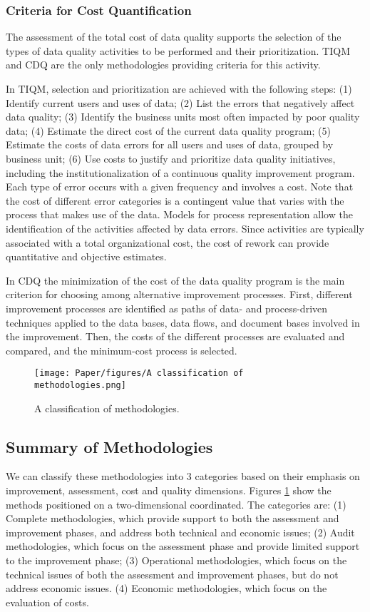 \documentclass[pdftex,english,oribibl]{llncs}
\begin{document}
\subsubsection{Criteria for Cost Quantification}
The assessment of the total cost of data quality supports the selection of the types of data quality activities to be performed and their prioritization. TIQM and CDQ are the only methodologies providing criteria for this activity.

In TIQM, selection and prioritization are achieved with the following steps:
(1) Identify current users and uses of data;
(2) List the errors that negatively affect data quality;
(3) Identify the business units most often impacted by poor quality data;
(4) Estimate the direct cost of the current data quality program;
(5) Estimate the costs of data errors for all users and uses of data, grouped by business unit;
(6) Use costs to justify and prioritize data quality initiatives, including the institutionalization of a continuous quality improvement program.
Each type of error occurs with a given frequency and involves a cost. Note that the cost of different error categories is a contingent value that varies with the process that makes use of the data. Models for process representation allow the identification of the activities affected by data errors. Since activities are typically associated with a total organizational cost, the cost of rework can provide quantitative and objective estimates.

In CDQ the minimization of the cost of the data quality program is the main criterion for choosing among alternative improvement processes. First, different improvement processes are identified as paths of data- and process-driven techniques applied to the data bases, data flows, and document bases involved in the improvement. Then, the costs of the different processes are evaluated and compared, and the minimum-cost
process is selected.


  \begin{figure}
    \centering
    \texttt{[image: Paper/figures/A classification of methodologies.png]}
    \caption{A classification of methodologies.}
    \label{fig:classificationMethodologies}
  \end{figure}

\subsection{Summary of Methodologies}
We can classify these methodologies into 3 categories based on their emphasis on improvement, assessment, cost and quality dimensions. Figures \ref{fig:classificationMethodologies} show the methods positioned on a two-dimensional coordinated. The categories are:
(1) Complete methodologies, which provide support to both the assessment and improvement phases, and address both technical and economic issues;
(2) Audit methodologies, which focus on the assessment phase and provide limited support to the improvement phase;
(3) Operational methodologies, which focus on the technical issues of both the assessment and improvement phases, but do not address economic issues. (4) Economic methodologies, which focus on the evaluation of costs.
\end{document}
